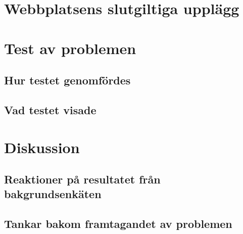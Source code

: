 \documentclass[11pt,a4paper]{article}
\begin{document}
        
    
\section{Webbplatsens slutgiltiga upplägg}
    
    
\section{Test av problemen}
    \label{sec:testavproblemen}
    
    
    \subsection{Hur testet genomfördes}
        \label{sec:HurTestetGjordes}
        
        
    \subsection{Vad testet visade}
    \label{sec:slutenkat}
    

\section{Diskussion}
    

    \subsection{Reaktioner på resultatet från bakgrundsenkäten}
        \label{Disk:Bakgrundsenat}
        
    
    \subsection{Tankar bakom framtagandet av problemen}
        \label{sec:tankarbakomprob}
        
        
        
        
\end{document}
